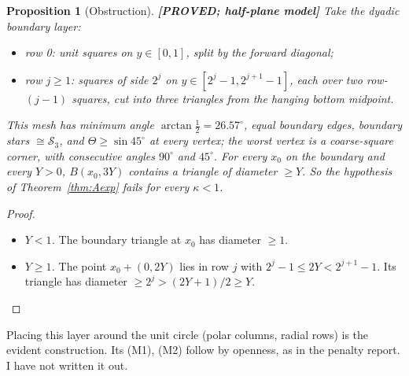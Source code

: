 \documentclass[11pt]{article}
\newtheorem{proposition}[theorem]{Proposition}
\theoremstyle{remark}\newtheorem{remark}[theorem]{Remark}
\newcommand{\lab}[1]{\textbf{[#1]}}
\newcommand{\cS}{\mathcal S}\newcommand{\hh}{\mathrm{I\!I}}\renewcommand{\div}{\operatorname{div}}
\begin{document}
\begin{proposition}[Obstruction]\lab{PROVED; half-plane model}
Take the dyadic boundary layer:
\begin{itemize}
\item row 0: unit squares on $y\in[0,1]$, split by the forward diagonal;
\item row $j\ge1$: squares of side $2^j$ on $y\in[2^j-1,2^{j+1}-1]$, each over two row-$(j-1)$ squares, cut into three
triangles from the hanging bottom midpoint.
\end{itemize}
This mesh has minimum angle $\arctan\frac12=26.57^\circ$, equal boundary edges, boundary stars $\cong\cS_3$, and
$\Theta\ge\sin45^\circ$ at every vertex; the worst vertex is a coarse-square corner, with consecutive angles $90^\circ$ and
$45^\circ$. For every $x_0$ on the boundary and every $Y>0$, $B(x_0,3Y)$ contains a triangle of diameter $\ge Y$. So the hypothesis of Theorem~\ref{thm:Aexp} fails for every $\kappa<1$.
\end{proposition}
\begin{proof}
\begin{itemize}
\item \emph{$Y<1$.} The boundary triangle at $x_0$ has diameter $\ge1$.
\item \emph{$Y\ge1$.} The point $x_0+(0,2Y)$ lies in row $j$ with $2^j-1\le2Y<2^{j+1}-1$. Its triangle has diameter
$\ge2^j>(2Y+1)/2\ge Y$.\qedhere
\end{itemize}
\end{proof}
Placing this layer around the unit circle (polar columns, radial rows) is the evident construction. Its (M1), (M2) follow by
openness, as in the penalty report. I have not written it out.
\end{document}
